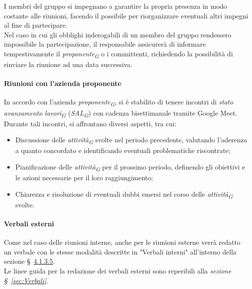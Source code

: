 \vspace{0.2cm}

I membri del gruppo si impegnano a garantire la propria presenza in modo costante alle riunioni, facendo il possibile per riorganizzare eventuali altri impegni al fine di partecipare. \\
Nel caso in cui gli obblighi inderogabili di un membro del gruppo rendessero impossibile la partecipazione, il responsabile assicurerà di informare tempestivamente il \textit{proponente}\textsubscript{\textit{G}} o i committenti, richiedendo la possibilità di rinviare la riunione ad una data successiva.

\paragraph*{Riunioni con l'azienda proponente}
In accordo con l'azienda \textit{proponente}\textsubscript{\textit{G}}, si è stabilito di tenere incontri di \textit{stato avanzamento lavori}\textsubscript{\textit{G}} (\textit{SAL}\textsubscript{\textit{G}}) con cadenza bisettimanale tramite Google Meet. \\
Durante tali incontri, si affrontano diversi aspetti, tra cui:
\begin{itemize}
		\item Discussione delle \textit{attività}\textsubscript{\textit{G}} svolte nel periodo precedente, valutando l'aderenza a quanto concordato e identificando eventuali problematiche riscontrate;
		\item Pianificazione delle \textit{attività}\textsubscript{\textit{G}} per il prossimo periodo, definendo gli obiettivi e le azioni necessarie per il loro raggiungimento;
		\item Chiarezza e risoluzione di eventuali dubbi emersi nel corso delle \textit{attività}\textsubscript{\textit{G}} svolte.
\end{itemize}

\paragraph*{Verbali esterni}
Come nel caso delle riunioni interne, anche per le riunioni esterne verrà redatto un verbale con le stesse modalità descritte in "Verbali interni" all'interno della sezione \S~\hyperlink{par:verbaliInterni}{4.1.3.5}. \\
Le linee guida per la redazione dei verbali esterni sono reperibili alla \textit{sezione \S~\ref{sec:Verbali}}.


